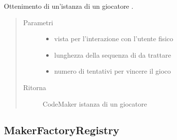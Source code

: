 \documentclass[letterpaper,10pt,italian,openany,oneside]{sphinxmanual}
\begin{document}
\begin{fulllineitems}
\label{\detokenize{test/it/unicam/cs/pa/mastermind/factories/MakerFactory:it.unicam.cs.pa.mastermind.factories.MakerFactory.getMaker(GameView, int, int)}}
Ottenimento di un’istanza di un giocatore .
\begin{quote}\begin{description}
\item[{Parametri}] \leavevmode\begin{itemize}
\item {} 
 \textendash{} vista per l’interazione con l’utente fisico

\item {} 
 \textendash{} lunghezza della sequenza di  da trattare

\item {} 
 \textendash{} numero di tentativi per vincere il gioco

\end{itemize}

\item[{Ritorna}] \leavevmode
CodeMaker istanza di un giocatore 

\end{description}\end{quote}

\end{fulllineitems}



\subsection{MakerFactoryRegistry}
\label{\detokenize{test/it/unicam/cs/pa/mastermind/factories/MakerFactoryRegistry:makerfactoryregistry}}\label{\detokenize{test/it/unicam/cs/pa/mastermind/factories/MakerFactoryRegistry::doc}}
\end{document}
